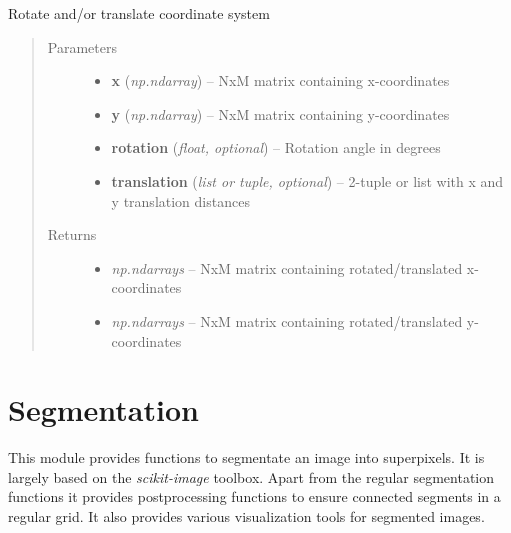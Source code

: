\documentclass[letterpaper,10pt,english]{sphinxmanual}
\begin{document}
\begin{fulllineitems}
\label{rectification:flamingo.rectification.plot.rotate_translate}
Rotate and/or translate coordinate system
\begin{quote}\begin{description}
\item[{Parameters}] \leavevmode\begin{itemize}
\item {} 
\textbf{x} (\emph{np.ndarray}) -- NxM matrix containing x-coordinates

\item {} 
\textbf{y} (\emph{np.ndarray}) -- NxM matrix containing y-coordinates

\item {} 
\textbf{rotation} (\emph{float, optional}) -- Rotation angle in degrees

\item {} 
\textbf{translation} (\emph{list or tuple, optional}) -- 2-tuple or list with x and y translation distances

\end{itemize}

\item[{Returns}] \leavevmode
\begin{itemize}
\item {} 
\emph{np.ndarrays} --
NxM matrix containing rotated/translated x-coordinates

\item {} 
\emph{np.ndarrays} --
NxM matrix containing rotated/translated y-coordinates

\end{itemize}


\end{description}\end{quote}

\end{fulllineitems}



\section{Segmentation}
\label{segmentation:segmentation}\label{segmentation::doc}
This module provides functions to segmentate an image into
superpixels. It is largely based on the \emph{scikit-image} toolbox.
Apart from the regular segmentation functions it provides
postprocessing functions to ensure connected segments in a regular
grid. It also provides various visualization tools for segmented
images.
\end{document}
